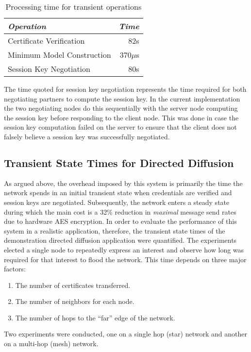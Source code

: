 
\begin{table}[tbhp]
  \newcommand\T{\rule{0pt}{2.1ex}}
  \centering
  \caption{Processing time for transient operations}
  {
  \begin{tabular}{|l|r|} \hline
    \textit{Operation} \T & \textit{Time} \\ \hline \hline

    Certificate Verification     \T &  82s \\ \hline 
    Minimum Model Construction   \T & 370$\mu$s \\ \hline
    Session Key Negotiation      \T &  80s\\ \hline
  \end{tabular}
  }
  \label{table-transient-time}
\end{table}

The time quoted for session key negotiation represents the time required for both negotiating
partners to compute the session key. In the current implementation the two negotiating nodes do
this sequentially with the server node computing the session key before responding to the client
node. This was done in case the session key computation failed on the server to ensure that the
client does not falsely believe a session key was successfully negotiated.

\subsection{Transient State Times for Directed Diffusion}

As argued above, the overhead imposed by this system is primarily the time the network spends in
an initial transient state when credentials are verified and session keys are negotiated.
Subsequently, the network enters a steady state during which the main cost is a 32\% reduction
in \emph{maximal} message send rates due to hardware AES encryption. In order to evaluate the
performance of this system in a realistic application, therefore, the transient state times of
the demonstration directed diffusion application were quantified. The experiments elected a
single node to repeatedly express an interest and observe how long was required for that
interest to flood the network. This time depends on three major factors:
\begin{enumerate}
\item The number of certificates transferred.
\item The number of neighbors for each node.
\item The number of hops to the ``far'' edge of the network.
\end{enumerate}
Two experiments were conducted, one on a single hop (star) network and another on a multi-hop
(mesh) network.

